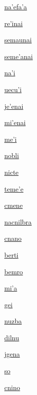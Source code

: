{\hyperlink{val:nahefaha}{na'efa'a}}{}{}{}

{\hyperlink{val:rehinai}{re'inai}}{}{}{}

{\hyperlink{val:semaunai}{semaunai}}{}{}{}

{\hyperlink{val:semehanai}{seme'anai}}{}{}{}

{\hyperlink{val:nahi}{na'i}}{}{}{}

{\hyperlink{val:uecuhi}{uecu'i}}{}{}{}

{\hyperlink{val:jehenai}{je'enai}}{}{}{}

{\hyperlink{val:mihenai}{mi'enai}}{}{}{}

{\hyperlink{val:mehi}{me'i}}{}{}{}

{\hyperlink{val:nobli}{nobli}}{}{}{}

{\hyperlink{val:nicte}{nicte}}{}{}{}

{\hyperlink{val:temehe}{teme'e}}{}{}{}

{\hyperlink{val:cmene}{cmene}}{}{}{}

{\hyperlink{val:nacnilbra}{nacnilbra}}{}{}{}

{\hyperlink{val:cnano}{cnano}}{}{}{}

{\hyperlink{val:berti}{berti}}{}{}{}

{\hyperlink{val:bemro}{bemro}}{}{}{}

{\hyperlink{val:miha}{mi'a}}{}{}{}

{\hyperlink{val:gei}{gei}}{}{}{}

{\hyperlink{val:nuzba}{nuzba}}{}{}{}

{\hyperlink{val:dilnu}{dilnu}}{}{}{}

{\hyperlink{val:jgena}{jgena}}{}{}{}

{\hyperlink{val:so}{so}}{}{}{}

{\hyperlink{val:cnino}{cnino}}{}{}{}

